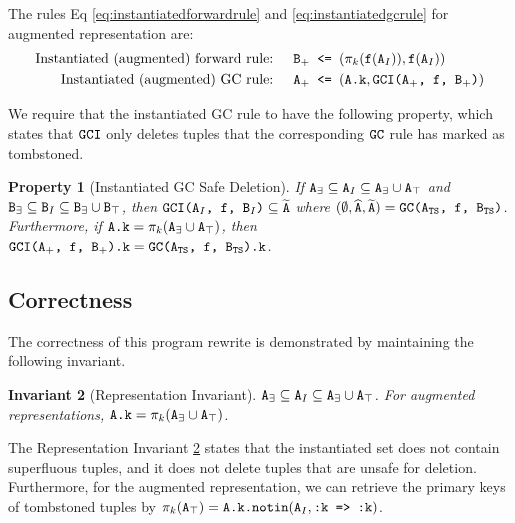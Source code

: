 \documentclass[10pt]{proc}
\numberwithin{equation}{section}
\newtheorem{property}{Property}[section]
\newtheorem{invariant}[property]{Invariant}
\renewcommand{\tt}[1]{\ifmmode\text{\texttt{#1}}\else\texttt{#1}\fi}
\begin{document}
The rules Eq \eqref{eq:instantiatedforwardrule} and \eqref{eq:instantiatedgcrule} for augmented representation are:
\begin{align}
\text{Instantiated (augmented) forward rule: } && \tt{B}_+ &\tt{ <= } (\pi_k(\tt{f}(\tt{A}_I)), \tt{f}(\tt{A}_I))\label{eq:augmentedforwardrule}\\
\text{Instantiated (augmented) GC rule: } && \tt{A}_+ &\tt{ <= } (\tt{A.k}, \tt{GCI(A$_+$, f, B$_+$)})\label{eq:augmentedgcrule}
\end{align}


We require that the instantiated GC rule to have the following property, which states that $\tt{GCI}$ only deletes tuples that the corresponding $\tt{GC}$ rule has marked as tombstoned.
\begin{property}[Instantiated GC Safe Deletion]\label{prp:gcisafe}
If $\tt{A}_\exists \subseteq \tt{A}_I \subseteq \tt{A}_\exists \cup \tt{A}_\top$ and $\tt{B}_\exists \subseteq \tt{B}_I \subseteq \tt{B}_\exists \cup \tt{B}_\top$, then $\tt{GCI(A$_I$, f, B$_I$)} \subseteq \widetilde{\tt{A}}$ where $(\emptyset, \widehat{\tt{A}}, \widetilde{\tt{A}}) = \tt{GC(A$_\text{TS}$, f, B$_\text{TS}$)}$.
Furthermore, if $\tt{A.k} = \pi_k(\tt{A}_\exists \cup \tt{A}_\top)$, then $\tt{GCI(A$_+$, f, B$_+$).k} = \tt{GC(A$_\text{TS}$, f, B$_\text{TS}$).k}$.
\end{property}

\subsection{Correctness}
The correctness of this program rewrite is demonstrated by maintaining the following invariant.
\begin{invariant}[Representation Invariant]\label{inv:representation}
$\tt{A}_\exists \subseteq \tt{A}_I \subseteq \tt{A}_\exists \cup \tt{A}_\top$.
For augmented representations, $\tt{A.k} = \pi_k(\tt{A}_\exists \cup \tt{A}_\top)$.
\end{invariant}
The Representation Invariant \ref{inv:representation} states that the instantiated set does not contain superfluous tuples, and it does not delete tuples that are unsafe for deletion.
Furthermore, for the augmented representation, we can retrieve the primary keys of tombstoned tuples by $\pi_k(\tt{A}_\top) = \tt{A.k}\tt{.notin}(\tt{A}_I, \tt{:k => :k})$.
\end{document}
